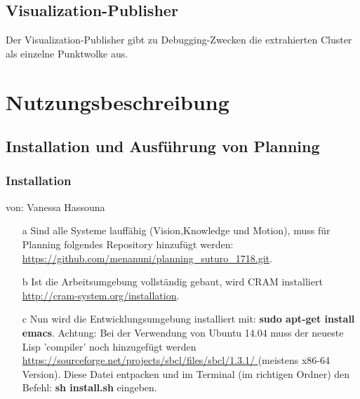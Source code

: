 \documentclass{suturo}
\makeatletter
\newcommand{\chapterauthor}[1]{%
  {\parindent0pt\vspace*{-27pt}%
  \linespread{0}\small\begin{flushright}von: #1\end{flushright}%
  \par\nobreak\vspace*{0pt}}
  \@afterheading%
}
\makeatother
\begin{document}
\subsection*{Visualization-Publisher}
Der Visualization-Publisher gibt zu Debugging-Zwecken die extrahierten Cluster als einzelne Punktwolke aus.

\begin{figure}[!htb]
\end{figure}

\newpage
\section{Nutzungsbeschreibung}

\subsection{Installation und Ausführung von Planning}

\subsubsection{Installation}
\chapterauthor{Vanessa Hassouna}
\begin{itemize}


\item[a] Sind alle Systeme lauffähig (Vision,Knowledge und Motion), muss für Planning folgendes Repository hinzufügt werden: \url{https://github.com/menanuni/planning_suturo_1718.git}. 

\item[b] Ist die Arbeitsumgebung vollständig gebaut, wird CRAM installiert \url{http://cram-system.org/installation}.

\item[c] Nun wird die Entwicklungsumgebung installiert mit: \textbf{sudo apt-get install emacs}. Achtung: Bei der Verwendung von Ubuntu 14.04 muss der neueste Lisp 'compiler' noch hinzugefügt werden \url{https://sourceforge.net/projects/sbcl/files/sbcl/1.3.1/
} (meistens x86-64 Version). Diese Datei entpacken und im Terminal (im richtigen Ordner) den Befehl: \textbf{sh install.sh} eingeben.
\end{itemize}
\end{document}
